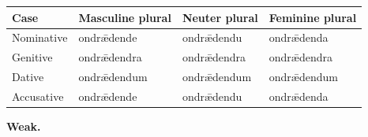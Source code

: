 \par\begingroup
\fontsize{10.5}{13.2}\selectfont
\setlength{\LTleft}{0pt}\setlength{\LTright}{\fill}
\noindent
\begin{tabular}{@{}>{\raggedright\arraybackslash}p{22.0mm}>{\raggedright\arraybackslash}p{31.188mm}>{\raggedright\arraybackslash}p{31.188mm}>{\raggedright\arraybackslash}p{31.188mm}@{}}
\toprule
\textbf{Case} & \textbf{Masculine plural} & \textbf{Neuter plural} & \textbf{Feminine plural} \\
\midrule
Nominative & ondrǣdende & ondrǣdendu & ondrǣdenda \\
Genitive & ondrǣdendra & ondrǣdendra & ondrǣdendra \\
Dative & ondrǣdendum & ondrǣdendum & ondrǣdendum \\
Accusative & ondrǣdende & ondrǣdendu & ondrǣdenda \\
\bottomrule
\end{tabular}
\par\endgroup

\textbf{Weak.}

